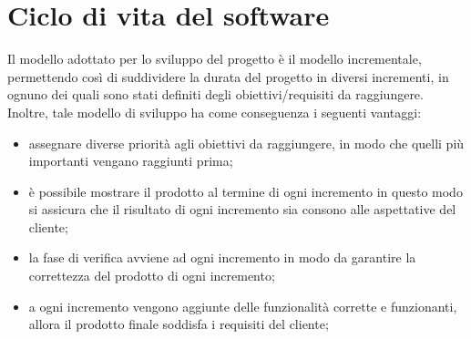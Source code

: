 
\section{Ciclo di vita del software}\label{sec:ciclo-vita-software}
Il modello adottato per lo sviluppo del progetto è il modello incrementale, permettendo così di suddividere la durata del progetto in diversi incrementi, in ognuno dei quali sono stati definiti degli obiettivi/requisiti da raggiungere.
Inoltre, tale modello di sviluppo ha come conseguenza i seguenti vantaggi:
\begin{itemize}
    \item assegnare diverse priorità agli obiettivi da raggiungere, in modo che quelli più importanti vengano raggiunti prima;
    \item è possibile mostrare il prodotto al termine di ogni incremento in questo modo si assicura che il risultato di ogni incremento sia consono alle aspettative del cliente;
    \item la fase di verifica avviene ad ogni incremento in modo da garantire la correttezza del prodotto di ogni incremento;
    \item a ogni incremento vengono aggiunte delle funzionalità corrette e funzionanti, allora il prodotto finale soddisfa i requisiti del cliente;
\end{itemize}